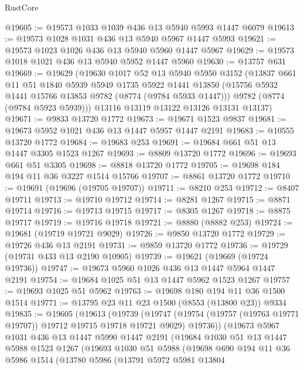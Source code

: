 \begin{lexlean}{RustCore}
\begin{coremodule}
@19605 := @19573 @1033 @1039 @436 @13 @5940 @5993 @1447 @6079
@19613 := @19573 @1028 @1031 @436 @13 @5940 @5967 @1447 @5993
@19621 := @19573 @1023 @1026 @436 @13 @5940 @5960 @1447 @5967
@19629 := @19573 @1018 @1021 @436 @13 @5940 @5952 @1447 @5960
@19630 := @13757 @631
@19669 := @19629
    (@19630
      @1017
      @52
      @13
      @5940
      @5950
      @3152
      (@13837
        @661
        @11
        @51
        @1840
        @5939
        @5949
        @1735
        @5922
        @1441
        @13850
        (@15756 @5932 @1441 @15766 @13853 @9782 (@8774 (@9784 @5933 @1447)))
        @9782
        (@8774 (@9784 @5923 @5939)))
      @13116
      @13119
      @13122
      @13126
      @13131
      @13137)
@19671 := @9833 @13720 @1772
@19673 := @19671 @1523 @9837
@19681 := @19673 @5952 @1021 @436 @13 @1447 @5957 @1447 @2191
@19683 := @10555 @13720 @1772
@19684 := @19683 @253
@19691 := @19684 @661 @51 @13 @1447 @3305 @1523 @1267
@19693 := @8809 @13720 @1772
@19696 := @19693 @661 @51 @3305
@19698 := @8818 @13720 @1772
@19705 := @19698 @184 @194 @11 @36 @3227 @1514 @15766
@19707 := @8861 @13720 @1772
@19710 := @19691 (@19696 (@19705 @19707))
@19711 := @8210 @253
@19712 := @8407 @19711
@19713 := @19710 @19712
@19714 := @8281 @1267
@19715 := @8871 @19714
@19716 := @19713 @19715
@19717 := @8305 @1267
@19718 := @8875 @19717
@19719 := @19716 @19718
@19721 := @8880 (@8882 @253)
@19724 := @19681 (@19719 @19721 @9029)
@19726 := @9850 @13720 @1772
@19729 := @19726 @436 @13 @2191
@19731 := @9859 @13720 @1772
@19736 := @19729 (@19731 @433 @13 @2190 @10905)
@19739 := @19621 (@19669 (@19724 @19736))
@19747 := @19673 @5960 @1026 @436 @13 @1447 @5964 @1447 @2191
@19754 := @19684 @1025 @51 @13 @1447 @5962 @1523 @1267
@19757 := @19693 @1025 @51 @5962
@19763 := @19698 @180 @194 @11 @36 @1500 @1514
@19771 := @13795 @23 @11 @23 @1500 (@8553 (@13800 @23)) @9334
@19835 := @19605
    (@19613
      (@19739
        (@19747 (@19754 (@19757 (@19763 @19771 @19707)) @19712 @19715 @19718 @19721 @9029) @19736))
      (@19673
        @5967
        @1031
        @436
        @13
        @1447
        @5990
        @1447
        @2191
        (@19684
          @1030
          @51
          @13
          @1447
          @5988
          @1523
          @1267
          (@19693
            @1030
            @51
            @5988
            (@19698
              @690
              @194
              @11
              @36
              @5986
              @1514
              (@13780
                @5986
                (@13791
                  @5972
                  @5981
                  @13804

\end{coremodule}
\end{lexlean}
